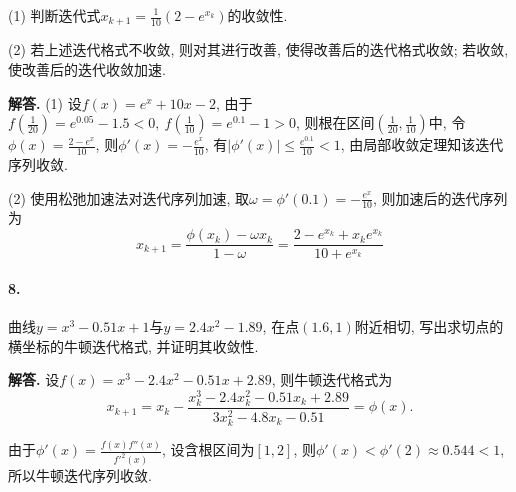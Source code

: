\documentclass[12pt, a4paper, oneside]{ctexart}
\newenvironment{solution}{\par\noindent\textbf{解答. }}{\bigskip\par}
\def\disp{\displaystyle}
\def\add{\vspace{0.5ex}}  %
\def\del{\vspace{-3.5ex}}  %
\begin{document}
(1) 判断迭代式$\disp x_{k+1}=\frac{1}{10}(2-e^{x_k})$的收敛性.\add

(2) 若上述迭代格式不收敛, 则对其进行改善, 使得改善后的迭代格式收敛; 若收敛, 使改善后的迭代收敛加速.

\begin{solution}
    (1) 设$f(x) = e^x+10x-2$, 由于$\disp f(\frac{1}{20}) = e^{0.05}-1.5 < 0,\ f(\frac{1}{10}) = e^{0.1}-1 > 0$, 则根在区间$\disp (\frac{1}{20}, \frac{1}{10})$中, 令$\disp \phi(x) = \frac{2-e^x}{10}$, 则$\disp \phi'(x) = -\frac{e^x}{10}$, 有$\disp |\phi'(x)|\leqslant \frac{e^{0.1}}{10} < 1$, \add 由局部收敛定理知该迭代序列收敛.

    (2) 使用松弛加速法对迭代序列加速, 取$\disp \omega = \phi'(0.1) = -\frac{e^x}{10}$, 则加速后的迭代序列为
    \begin{equation*}
        x_{k+1} = \frac{\phi(x_k)-\omega x_k}{1-\omega}= \frac{2-e^{x_k}+x_ke^{x_k}}{10+e^{x_k}}
    \end{equation*}
\end{solution}
\del\del
\paragraph{8.}曲线$y=x^3-0.51x+1$与$y=2.4x^2-1.89$, 在点$(1.6,1)$附近相切, 写出求切点的横坐标的牛顿迭代格式, 并证明其收敛性.
\begin{solution}
    设$f(x) = x^3-2.4x^2-0.51x+2.89$, 则牛顿迭代格式为
    \begin{equation*}
        \disp x_{k+1} = x_k-\frac{x_k^3-2.4x_k^2-0.51x_k+2.89}{3x_k^2-4.8x_k-0.51}=\phi(x).
    \end{equation*}

    由于$\disp \phi'(x) = \frac{f(x)f''(x)}{f'^2(x)}$, 设含根区间为$[1,2]$, 则$\phi'(x) < \phi'(2)\approx 0.544 < 1$, 所以牛顿迭代序列收敛.
\end{solution}

\iffalse
\centerline{
    \texttt{[image: figure.png]}
}
\fi
\iffalse
\renewcommand\arraystretch{0.8} %
\begin{table}[!htbp] %
    \centering %
    \begin{tabular}{p{1cm}<{\centering}p{1cm}<{\centering}p{3cm}<{\centering}p{5cm}<{\centering}} %
        \toprule
        $x_i$ & $f[x_1]$ & $f[x_i,x_{i+1}]$ & $f[x_i,x_{i+1},x_{i+2}]$ \\
        \midrule
        $x_0$ & $f(x_0)$ &                  &                          \\
        $x_0$ & $f(x_0)$ & $f'(x_0)$        &                          \\
        $x_0$ & $f(x_1)$ & $\frac{f(x_1)-f(x_0)}{x_1-x_0}$ & $\frac{f(x_1)-f(x_0)}{(x_1-x_0)^2}-\frac{f'(x_0)}{x_1-x_0}$\\
        \bottomrule
    \end{tabular}
\end{table}

\def\Log{\text{Log}} %
$\Log$ %
\fi
\end{document}
